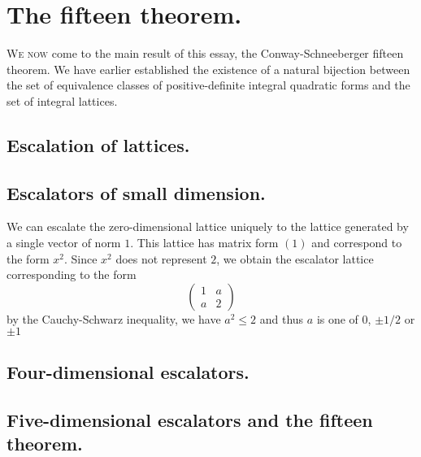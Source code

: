 \chapter{The fifteen theorem.}
\label{chap:conway-schneeberger}

{\scshape We now} come to the main result of this essay, the Conway-Schneeberger fifteen theorem. We have earlier established the existence of a natural bijection between the set of equivalence classes of positive-definite integral quadratic forms and the set of integral lattices.

\section{Escalation of lattices.}


\section{Escalators of small dimension.}

We can escalate the zero-dimensional lattice uniquely to the lattice generated by a single vector of norm \(1\). This lattice has matrix form \((1)\) and correspond to the form \(x^2\). Since \(x^2\) does not represent \(2\), we obtain the escalator lattice corresponding to the form
\[
    \begin{pmatrix}
        1 & a \\
        a & 2
    \end{pmatrix}  
\]
by the Cauchy-Schwarz inequality, we have \(a^2 \leq 2\) and thus \(a\) is one of \(0\), \(\pm 1/2\) or \(\pm 1\)

\section{Four-dimensional escalators.}

\section{Five-dimensional escalators and the fifteen theorem.}